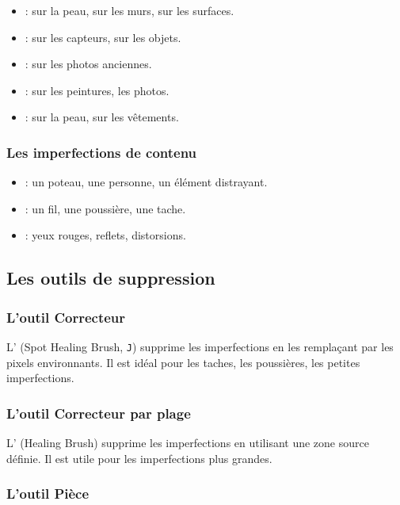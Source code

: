 \begin{itemize}
    \item {} : sur la peau, sur les murs, sur les surfaces.
    \item {} : sur les capteurs, sur les objets.
    \item {} : sur les photos anciennes.
    \item {} : sur les peintures, les photos.
    \item {} : sur la peau, sur les vêtements.
\end{itemize}

\subsubsection{Les imperfections de contenu}

\begin{itemize}
    \item {} : un poteau, une personne, un élément distrayant.
    \item {} : un fil, une poussière, une tache.
    \item {} : yeux rouges, reflets, distorsions.
\end{itemize}

\subsection{Les outils de suppression}

\subsubsection{L'outil Correcteur}

L' (Spot Healing Brush, \texttt{J}) supprime les imperfections en les remplaçant par les pixels environnants. Il est idéal pour les taches, les poussières, les petites imperfections.

\subsubsection{L'outil Correcteur par plage}

L' (Healing Brush) supprime les imperfections en utilisant une zone source définie. Il est utile pour les imperfections plus grandes.

\subsubsection{L'outil Pièce}


